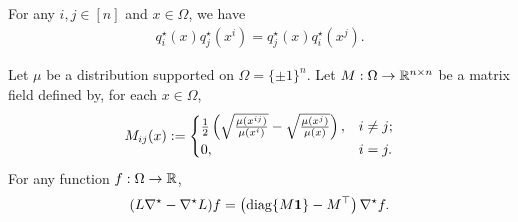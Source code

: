 \begin{fact}\label{fact:square}
    For any $i,j \in [n]$ and $x \in \Omega$, we have
    \begin{align*}
        q^\star_i(x) q^\star_j(x^i) = q^\star_j(x) q^\star_i(x^j).
    \end{align*}
\end{fact}

\begin{lemma}
\label{lem:commutator}
    Let $\mu$ be a distribution supported on $\Omega = \{\pm 1\}^n$.
    Let $M: \Omega \to \mathbb{R}^{n \times n}$ be a matrix field defined by, for each $x \in \Omega$,
    \begin{align}\label{eq:local-matrix}
        M_{ij}(x) := 
        \begin{cases}
            \frac{1}2 \left(\sqrt{\frac{\mu(x^{ij})}{\mu(x^i)}}-\sqrt{\frac{\mu(x^j)}{\mu(x)}}\right), & i \neq j;\\
            0, & i = j.
        \end{cases}
    \end{align}
    For any function $f: \Omega \to \mathbb{R}$,
    \begin{align*}
        (L \nabla^\star - \nabla^\star L) f = \left( \mathrm{diag}\{M\boldsymbol{1}\} - M^\top \right) \nabla^\star f.
    \end{align*}
\end{lemma}

